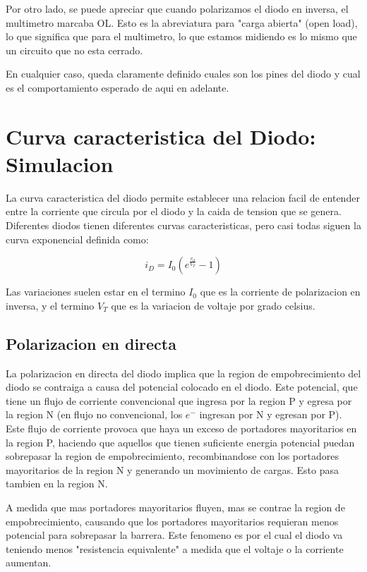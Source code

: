 \documentclass[chaptersright]{informeutn}
\begin{document}
    Por otro lado, se puede apreciar que cuando polarizamos el diodo en inversa, el multimetro marcaba OL. Esto es la
    abreviatura para "carga abierta" (open load), lo que significa que para el multimetro, lo que estamos midiendo es
    lo mismo que un circuito que no esta cerrado.

    En cualquier caso, queda claramente definido cuales son los pines del diodo y cual es el comportamiento esperado
    de aqui en adelante.


  \chapter{Curva caracteristica del Diodo: Simulacion}
    La curva caracteristica del diodo permite establecer una relacion facil de entender entre la corriente que circula
    por el diodo y la caida de tension que se genera. Diferentes diodos tienen diferentes curvas caracteristicas, pero
    casi todas siguen la curva exponencial definida como:

    \begin{equation}
      i_D = I_0 \left(e^{\frac{v_d}{V_T}} - 1 \right)
      \label{eq.caracteristica}
    \end{equation}

    Las variaciones suelen estar en el termino $I_0$ que es la corriente de polarizacion en inversa, y el termino $V_T$
    que es la variacion de voltaje por grado celsius.

    \section{Polarizacion en directa}
      La polarizacion en directa del diodo implica que la region de empobrecimiento del diodo se contraiga a causa del
      potencial colocado en el diodo. Este potencial, que tiene un flujo de corriente convencional que ingresa por la
      region P y egresa por la region N (en flujo no convencional, los $e^-$ ingresan por N y egresan por P). Este
      flujo de corriente provoca que haya un exceso de portadores mayoritarios en la region P, haciendo que aquellos
      que tienen suficiente energia potencial puedan sobrepasar la region de empobrecimiento, recombinandose con los
      portadores mayoritarios de la region N y generando un movimiento de cargas. Esto pasa tambien en la region N.

      A medida que mas portadores mayoritarios fluyen, mas se contrae la region de empobrecimiento, causando que los
      portadores mayoritarios requieran menos potencial para sobrepasar la barrera. Este fenomeno es por el cual el
      diodo va teniendo menos "resistencia equivalente" a medida que el voltaje o la corriente aumentan.
\end{document}
